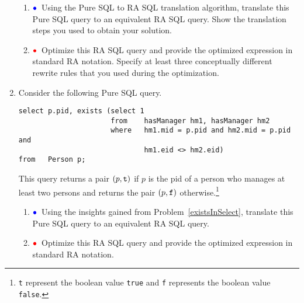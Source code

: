 \documentclass[11pt]{article}
\newcommand{\red}[1]{{\color{red}#1}}
\newcommand{\blue}[1]{{\color{blue}#1}}
\newcommand{\redbullet}{$\red{\bullet}$}
\newcommand{\bluebullet}{$\blue{\bullet}$}
\begin{document}
\begin{enumerate}[resume]
{\begin{verbatim}
\end{verbatim}  }  

\begin{enumerate}  
\item  \bluebullet\ Using the Pure SQL to RA SQL translation algorithm, translate this Pure SQL query to an
equivalent RA SQL query.   Show the translation steps you used to obtain your solution.
\item  \redbullet\ Optimize this RA SQL query and provide the optimized expression in standard RA notation.
Specify at least three conceptually different rewrite rules that you used during the optimization.

\end{enumerate}

\item Consider the following Pure SQL query.
{\footnotesize
\begin{verbatim}
select p.pid, exists (select 1
                      from    hasManager hm1, hasManager hm2
                      where   hm1.mid = p.pid and hm2.mid = p.pid and 
                              hm1.eid <> hm2.eid) 
from   Person p;
\end{verbatim}
}


This query returns a pair $(p,{\tt t})$ if $p$ is the pid of a person who manages at least two persons
and returns the pair $(p,{\tt f})$ otherwise.\footnote{{\tt t} represent the boolean value {\tt true} and
{\tt f} represents the boolean value {\tt false}.} 

\begin{enumerate}
\item  \bluebullet\ Using the insights gained from Problem~\ref{existsInSelect}, translate this Pure SQL query to an
equivalent RA SQL query.   
\item  \redbullet\ Optimize this RA SQL query and provide the optimized expression in standard RA notation.
\end{enumerate}
\end{enumerate}
\newpage
\end{document}
